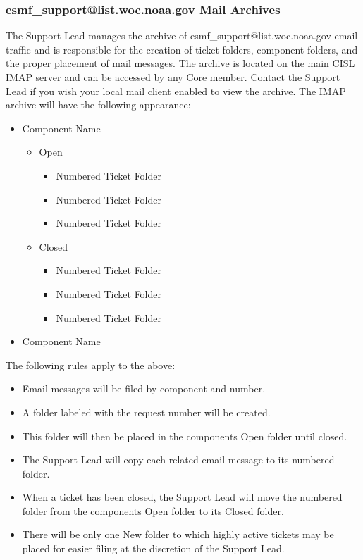 \subsubsection{esmf\_support@list.woc.noaa.gov Mail Archives}
The Support Lead manages the archive of esmf\_support@list.woc.noaa.gov email traffic and is responsible for the creation of ticket folders, component folders, and the proper placement of mail messages. The archive is located on the main CISL IMAP server and can be accessed by any Core member.  Contact the Support Lead if you wish your local mail client enabled to view the archive.  The IMAP archive will have the following appearance:
\begin{itemize}
\item{Component Name}
  \begin{itemize}
    \item{Open}
      \begin{itemize}
        \item{Numbered Ticket Folder}
        \item{Numbered Ticket Folder}
        \item{Numbered Ticket Folder}
      \end{itemize}
    \item{Closed}
      \begin{itemize}
        \item{Numbered Ticket Folder}
        \item{Numbered Ticket Folder}
        \item{Numbered Ticket Folder}
      \end{itemize}
    \end{itemize}
\item{Component Name}
\end{itemize}

The following rules apply to the above:

\begin{itemize}
\item Email messages will be filed by component and number. 
\item A folder labeled with the request number will be created. 
\item This folder will then be placed in the components Open folder until closed.  
\item The Support Lead will copy each related email message to its numbered folder. 
\item When a ticket has been closed, the Support Lead will move the numbered folder from the components Open folder to its Closed folder.
\item There will be only one New folder to which highly active tickets may be placed 
for easier filing at the discretion of the Support Lead. 
\end{itemize}

